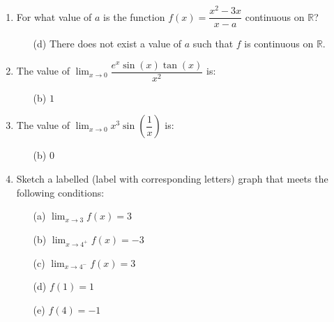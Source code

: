 \documentclass[12pt]{book}
\begin{document}
\begin{enumerate}
\item For what value of $a$ is the function $f(x) = \dfrac{x^2 - 3x}{x-a}$ continuous on $\mathbb{R}$?
\begin{enumerate}
\item[(d)] There does not exist a value of $a$ such that $f$ is continuous on $\mathbb{R}$.
\end{enumerate}

\item The value of $\lim_{x\to 0}\limits \dfrac{e^x \sin(x) \tan(x)}{x^2}$ is:
\begin{enumerate}
\item[(b)] $1$
\end{enumerate}

\item The value of $\lim_{x\to 0}\limits x^3 \sin\left(\dfrac{1}{x}\right)$ is:
\begin{enumerate}
\item[(b)] $0$
\end{enumerate}

\newpage

\item Sketch a labelled (label with corresponding letters) graph that meets the following conditions:

\begin{enumerate}
\item[(a)] $\lim_{x\to 3}\limits f(x) = 3$
\item[(b)] $\lim_{x\to 4^+}\limits f(x) = -3$
\item[(c)] $\lim_{x\to 4^-}\limits f(x) =3$
\item[(d)] $f(1)=1$
\item[(e)] $f(4)=-1$
\end{enumerate} 

\begin{minipage}{0.5\textwidth}
    \begin{figure}[H]
    \end{figure} 
\end{minipage}


\end{enumerate}
\end{document}
